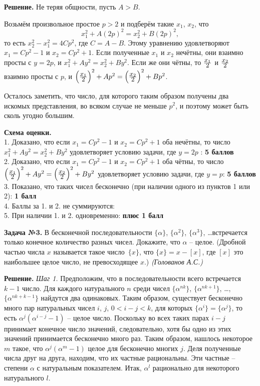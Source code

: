 \documentclass[12pt]{article}
\def \Problem#1{\par \bigskip \textbf{Задача №{#1}. }}
\def \solution{\par \bigskip \textbf{Решение. }}
\def \marking{\par \bigskip \textbf{Схема оценки. }}
\def\frac#1#2{\mathchoice{#1\over#2}{\hbox{\small$#1$}\over\mathstrut\hbox{\small$#2$}}{#1\over#2}{#1\over#2}}
\begin{document}
\solution  Не теряя общности, пусть $A>B$.

Возьмём произвольное простое $p>2$ и подберём такие
$x_1$, $x_2$, что
$$x_1^2+A(2p)^2=x_2^2+B(2p)^2,$$
то есть $x_2^2-x_1^2=4Cp^2$, где $C=A-B$. Этому уравнению удовлетворяют
$x_1=Cp^2-1$ и $x_2=Cp^2+1$. Если полученные $x_1$ и $x_2$ нечётны, они взаимно
просты с $y=2p$, и $x_1^2+Ay^2=x_2^2+By^2$. Если же они чётны, то
$\frac{x_1}{2}$ и $\frac{x_2}{2}$ взаимно просты с $p$,
и $\left(\frac{x_1}{2}\right)^2+Ap^2=\left(\frac{x_2}{2}\right)^2+Bp^2$.

Осталось заметить, что число, для которого таким образом получены два
искомых представления, во всяком случае не меньше $p^2$, и поэтому может
быть сколь угодно большим.

\marking
\\ 1. Доказано, что если $x_1 = Cp^2 - 1$ и $x_2 = Cp^2 + 1$ оба нечётны, то число $x_1^2 + Ay^2 = x_2^2 + By^2$ удовлетворяет условию задачи, где $y = 2p$ : \dotfill \textbf{ 5 баллов} 
\\ 2. Доказано, что если $x_1 = Cp^2 - 1$ и $x_2 = Cp^2 + 1$ оба чётны, то число $\left(\frac{x_1}{2}\right)^2+Ay^2=\left(\frac{x_2}{2}\right)^2+By^2$ удовлетворяет условию задачи, где $y = p$: \dotfill \textbf{ 5 баллов} 
\\ 3. Показано, что таких чисел бесконечно (при наличии одного из пунктов 1 или 2): \dotfill \textbf{ 1 балл}
\\ 4. Баллы за 1. и 2. не суммируются: \dotfill
\\ 5. При наличии 1. и 2. одновременно: \dotfill \textbf{плюс 1 балл}

\Problem{3} В бесконечной последовательности $\{\alpha\}$, $\{\alpha^2\}$, $\{\alpha^3\}$, \dots  встречается только конечное количество разных чисел. Докажите, что $\alpha$ -- целое. (Дробной частью числа $x$ называется такое число~$\{x\}$, что $\{x\} = x-[x]$, где $[x]$ это наибольшее целое число, не превосходящее $x$.) \textit{(Голованов А.С.)}

\solution \textit{Шаг 1.} Предположим, что в последовательности всего встречается 
$k-1$ число. Для каждого натурального $n$ среди чисел $\{\alpha^{nk}\}$, 
$\{\alpha^{nk+1}\}$, \dots, $\{\alpha^{nk+k-1}\}$ найдутся два одинаковых. 
Таким образом, существует бесконечно много пар натуральных чисел $i$, $j$, 
$0<i-j<k$, для которых $\{\alpha^i\}=\{\alpha^j\}$, то есть 
$\alpha^j(\alpha^{i-j}-1)$ -- целое число. Поскольку во всех таких парах 
$i-j$ принимает конечное число значений, следовательно, хотя бы одно из этих 
значений принимается бесконечно много раз. Таким образом, нашлось некоторое 
$m$ такое, что $\alpha^j(\alpha^m-1)$ целое для бесконечно многих $j$. 
Деля полученные числа друг на друга, находим, что их частные рациональны. 
Эти частные -- степени $\alpha$ с натуральным показателем. Итак, $\alpha^l$ 
рационально для некоторого натурального $l$. 
\end{document}

